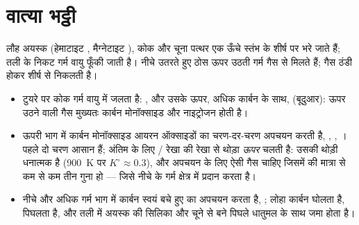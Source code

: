 \section{वात्या भट्ठी}

लौह अयस्क (हेमाटाइट , मैग्नेटाइट ), कोक और चूना पत्थर
एक ऊँचे स्तंभ के शीर्ष पर भरे जाते हैं; तली के निकट गर्म वायु
फूँकी जाती है। नीचे उतरते हुए ठोस ऊपर उठती गर्म गैस से मिलते हैं; गैस
ठंडी होकर शीर्ष से निकलती है।
\begin{itemize}
  \item टुयरे पर कोक गर्म वायु में जलता है: , और
        उसके ऊपर, अधिक कार्बन के साथ,  (बूदुआर): ऊपर उठने वाली
        गैस मुख्यतः कार्बन मोनॉक्साइड और नाइट्रोजन होती है।
  \item ऊपरी भाग में कार्बन मोनॉक्साइड आयरन ऑक्साइडों का चरण-दर-चरण
        अपचयन करती है, , ,
        । पहले दो चरण आसान हैं; अंतिम के लिए
        / रेखा  की रेखा से थोड़ा \textit{ऊपर}
        चलती है: उसकी  थोड़ी धनात्मक है
        (\qty{900}{K} पर $K^\circ \approx 0.3$), और अपचयन के लिए ऐसी गैस चाहिए
        जिसमें  की मात्रा  से कम से कम तीन गुना हो --- जिसे नीचे के गर्म क्षेत्र में
         प्रदान करता है।
  \item नीचे और अधिक गर्म भाग में कार्बन स्वयं बचे हुए का अपचयन करता है, ; लोहा कार्बन घोलता है, पिघलता है, और तली में
        अयस्क की सिलिका और चूने से बने पिघले धातुमल के साथ जमा होता है।
\end{itemize}

